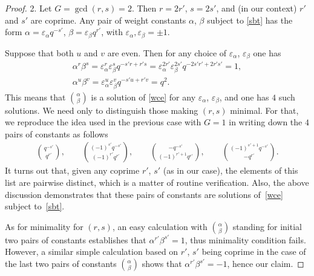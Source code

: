 \documentclass[10pt,a4paper]{amsart}
\numberwithin{equation}{section}
\begin{document}
\begin{proof}
2. Let $G=\operatorname{gcd}(r,s)=2$. Then $r=2r'$, $s=2s'$, and (in our context) $r'$ and $s'$ are coprime. Any pair of weight constants $\alpha$, $\beta$ subject to \eqref{sbt} has the form $\alpha=\varepsilon_\alpha q^{-s'}$, $\beta=\varepsilon_\beta q^{r'}$, with $\varepsilon_\alpha,\varepsilon_\beta=\pm 1$.

Suppose that both $u$ and $v$ are even. Then for any choice of $\varepsilon_\alpha$, $\varepsilon_\beta$ one has
\begin{gather*}
\alpha^r\beta^s=\varepsilon_\alpha^r\varepsilon_\beta^sq^{-s'r+r's}=\varepsilon_\alpha^{2r'}\varepsilon_\beta^{2s'}q^{-2s'r'+2r's'}=1,\\
\alpha^u\beta^v=\varepsilon_\alpha^u\varepsilon_\beta^vq^{-s'u+r'v}=q^2.\end{gather*}
This means that $\binom{\alpha}{\beta}$ is a solution of \eqref{wce} for any $\varepsilon_\alpha$, $\varepsilon_\beta$, and one has $4$ such solutions. We need only to distinguish those making $(r,s)$ minimal. For that, we reproduce the idea used in the previous case with $G=1$ in writing down the $4$ pairs of constants as follows
\begin{gather*}
\binom{q^{-s'}}{q^{r'}},\qquad\binom{(-1)^{s'}q^{-s'}}{(-1)^{r'}q^{r'}},\qquad \binom{-q^{-s'}}{(-1)^{r'+1}q^{r'}},\qquad\binom{(-1)^{s'+1}q^{-s'}}{-q^{r'}}.
\end{gather*}
It turns out that, given any coprime $r'$, $s'$ (as in our case), the elements of this list are pairwise distinct, which is a matter of routine verification. Also, the above discussion demonstrates that these pairs of constants are solutions of~\eqref{wce} subject to~\eqref{sbt}.

As for minimality for $(r,s)$, an easy calculation with $\binom{\alpha}{\beta}$ standing for initial two pairs of constants establishes that $\alpha^{r'}\beta^{s'}=1$, thus minimality condition fails. However, a similar simple calculation based on $r'$, $s'$ being coprime in the case of the last two pairs of constants $\binom{\alpha}{\beta}$ shows that $\alpha^{r'}\beta^{s'}=-1$, hence our claim.


\end{proof}
\end{document}
